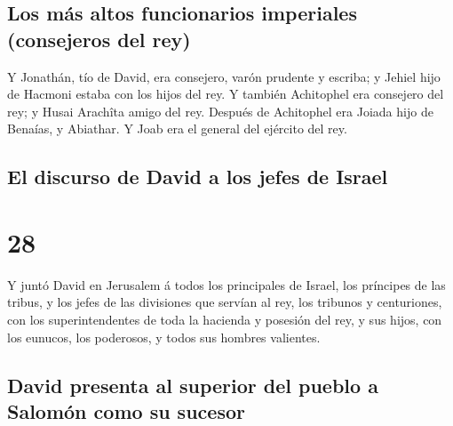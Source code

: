 \hypertarget{los-muxe1s-altos-funcionarios-imperiales-consejeros-del-rey}{%
\subsection{Los más altos funcionarios imperiales (consejeros del
rey)}\label{los-muxe1s-altos-funcionarios-imperiales-consejeros-del-rey}}

 Y Jonathán, tío de David, era consejero, varón prudente
y escriba; y Jehiel hijo de Hacmoni estaba con los hijos del rey.
 Y también Achitophel era consejero del rey; y Husai
Arachîta amigo del rey.  Después de Achitophel era Joiada
hijo de Benaías, y Abiathar. Y Joab era el general del ejército del rey.

\hypertarget{el-discurso-de-david-a-los-jefes-de-israel}{%
\subsection{El discurso de David a los jefes de
Israel}\label{el-discurso-de-david-a-los-jefes-de-israel}}

\hypertarget{section-13-28}{%
\section{28}\label{section-13-28}}

 Y juntó David en Jerusalem á todos los principales de
Israel, los príncipes de las tribus, y los jefes de las divisiones que
servían al rey, los tribunos y centuriones, con los superintendentes de
toda la hacienda y posesión del rey, y sus hijos, con los eunucos, los
poderosos, y todos sus hombres valientes.

\hypertarget{david-presenta-al-superior-del-pueblo-a-salomuxf3n-como-su-sucesor}{%
\subsection{David presenta al superior del pueblo a Salomón como su
sucesor}\label{david-presenta-al-superior-del-pueblo-a-salomuxf3n-como-su-sucesor}}

